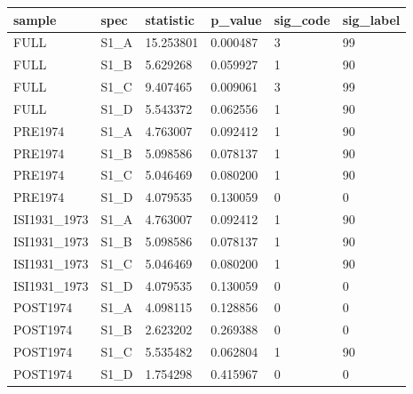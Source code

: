 \begin{tabular}{llllll}
\hline
sample & spec & statistic & p\_value & sig\_code & sig\_label \\
\hline
FULL & S1\_A & 15.253801 & 0.000487 & 3 & 99 \\
FULL & S1\_B & 5.629268 & 0.059927 & 1 & 90 \\
FULL & S1\_C & 9.407465 & 0.009061 & 3 & 99 \\
FULL & S1\_D & 5.543372 & 0.062556 & 1 & 90 \\
PRE1974 & S1\_A & 4.763007 & 0.092412 & 1 & 90 \\
PRE1974 & S1\_B & 5.098586 & 0.078137 & 1 & 90 \\
PRE1974 & S1\_C & 5.046469 & 0.080200 & 1 & 90 \\
PRE1974 & S1\_D & 4.079535 & 0.130059 & 0 & 0 \\
ISI1931\_1973 & S1\_A & 4.763007 & 0.092412 & 1 & 90 \\
ISI1931\_1973 & S1\_B & 5.098586 & 0.078137 & 1 & 90 \\
ISI1931\_1973 & S1\_C & 5.046469 & 0.080200 & 1 & 90 \\
ISI1931\_1973 & S1\_D & 4.079535 & 0.130059 & 0 & 0 \\
POST1974 & S1\_A & 4.098115 & 0.128856 & 0 & 0 \\
POST1974 & S1\_B & 2.623202 & 0.269388 & 0 & 0 \\
POST1974 & S1\_C & 5.535482 & 0.062804 & 1 & 90 \\
POST1974 & S1\_D & 1.754298 & 0.415967 & 0 & 0 \\
\hline
\end{tabular}

